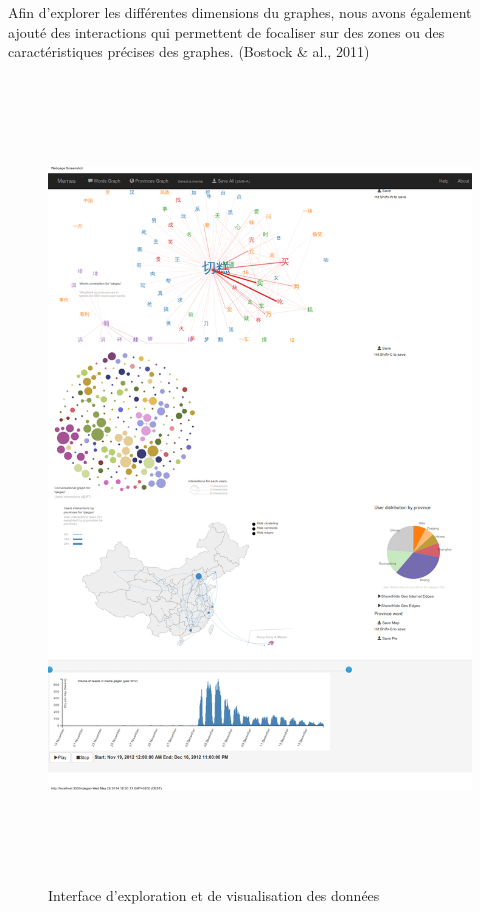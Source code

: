 Afin d{\textquoteright}explorer les diff\'erentes dimensions du graphes,
nous avons \'egalement ajout\'e des interactions qui permettent de
focaliser sur des zones ou des caract\'eristiques pr\'ecises des
graphes. (Bostock \& al., 2011)

\begin{figure}
    \centering
    \includegraphics[width=6.7213in,height=8.3894in]{figures/chap3/chapitre3-img21.png}
    \caption{Interface d'exploration et de visualisation des données}
\end{figure}